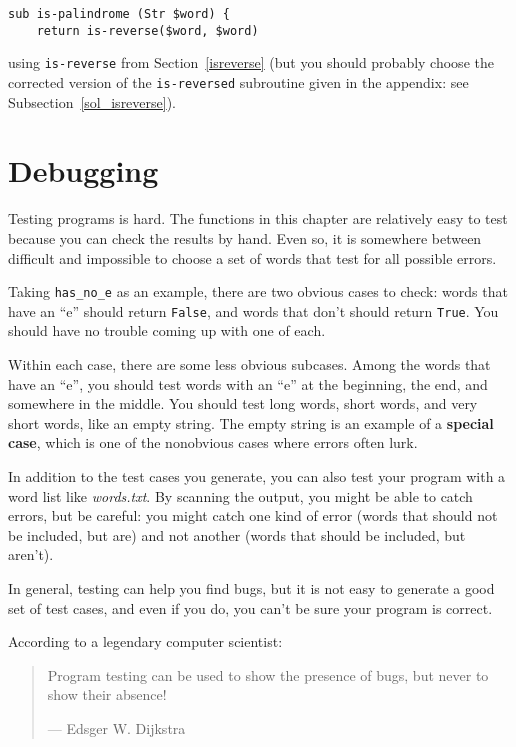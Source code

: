 \begin{verbatim}
sub is-palindrome (Str $word) {
    return is-reverse($word, $word)
\end{verbatim}
%
using \verb"is-reverse" from Section~\ref{isreverse} (but
you should probably choose the corrected version of the 
{\tt is-reversed} subroutine given in the appendix: 
see Subsection~\ref{sol_isreverse}).


\section{Debugging}

Testing programs is hard.  The functions in this chapter are
relatively easy to test because you can check the results by hand.
Even so, it is somewhere between difficult and impossible to choose a
set of words that test for all possible errors.

Taking \verb"has_no_e" as an example, there are two obvious
cases to check: words that have an ``e'' should return {\tt False}, and
words that don't should return {\tt True}.  You should have no
trouble coming up with one of each.

Within each case, there are some less obvious subcases.  Among the
words that have an ``e'', you should test words with an ``e'' at the
beginning, the end, and somewhere in the middle.  You should test long
words, short words, and very short words, like an empty string.  The
empty string is an example of a {\bf special case}, which is one of
the nonobvious cases where errors often lurk.

In addition to the test cases you generate, you can also test
your program with a word list like \emph{words.txt}.  By scanning
the output, you might be able to catch errors, but be careful:
you might catch one kind of error (words that should not be
included, but are) and not another (words that should be included,
but aren't).

In general, testing can help you find bugs, but it is not easy to
generate a good set of test cases, and even if you do, you can't
be sure your program is correct.

According to a legendary computer scientist:

\begin{quote}
Program testing can be used to show the presence of bugs, 
but never to show their absence!

--- Edsger W. Dijkstra
\end{quote}


